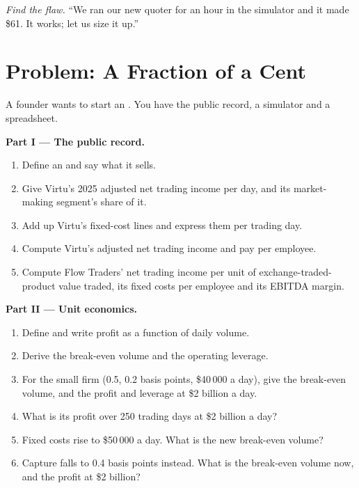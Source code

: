\begin{exercise}[$\star\star\star$]\label{exo:hf:the-business-of-market-making:8}
\emph{Find the flaw.} ``We ran our new quoter for an hour in the simulator and it made \$61. It works; let us size it up.''
\end{exercise}

\section{Problem: A Fraction of a Cent}

\begin{problem}\label{pb:hf:the-business-of-market-making:1}
A founder wants to start an . You have the public record, a simulator and a spreadsheet.

\medskip\noindent\textbf{Part I --- The public record.}
\begin{enumerate}
\item Define an  and say what it sells.
\item Give Virtu's 2025 adjusted net trading income per day, and its market-making segment's share of it.
\item Add up Virtu's fixed-cost lines and express them per trading day.
\item Compute Virtu's adjusted net trading income and pay per employee.
\item Compute Flow Traders' net trading income per unit of exchange-traded-product value traded, its fixed costs per employee and its EBITDA margin.
\end{enumerate}

\medskip\noindent\textbf{Part II --- Unit economics.}
\begin{enumerate}[resume]
\item Define  and write profit as a function of daily volume.
\item Derive the break-even volume and the operating leverage.
\item For the small firm (0.5, 0.2 basis points, \$40\,000 a day), give the break-even volume, and the profit and leverage at \$2 billion a day.
\item What is its profit over 250 trading days at \$2 billion a day?
\item Fixed costs rise to \$50\,000 a day. What is the new break-even volume?
\item Capture falls to 0.4 basis points instead. What is the break-even volume now, and the profit at \$2 billion?
\end{enumerate}


\end{problem}
